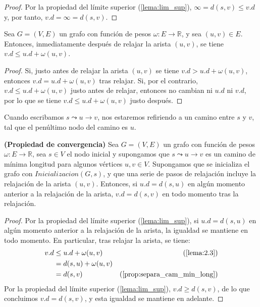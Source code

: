 \begin{proof}
	Por la propiedad del límite superior (\autoref{lema:lim_sup}), $\infty=d(s,v)\leq v.d$ y, por tanto, $v.d=\infty =d(s,v).$
\end{proof}

\begin{lema}\label{lema:2.3}
	Sea $G=(V,E)$ un grafo con función de pesos $\omega : E\rightarrow \mathbb{R}$, y sea $(u,v)\in E$. Entonces, inmediatamente después de relajar la arista $(u,v)$, se tiene $v.d\leq u.d + \omega(u,v)$.
\end{lema}

\begin{proof}
	Si, justo antes de relajar la arista $(u,v)$ se tiene $v.d > u.d + \omega(u,v)$, entonces $v.d = u.d + \omega(u,v)$ tras relajar. Si, por el contrario, $v.d\leq u.d + \omega(u,v)$ justo antes de relajar, entonces no cambian ni $u.d$ ni $v.d$, por lo que se tiene $v.d\leq u.d + \omega(u,v)$ justo después.
\end{proof}

\begin{observacion}
	Cuando escribamos $s \leadsto u \rightarrow v$, nos estaremos refiriendo a un camino entre $s$ y $v$, tal que el penúltimo nodo del camino es $u$.
\end{observacion}

\begin{lema}\label{lema:convergencia}
	\textbf{(Propiedad de convergencia)} Sea $G=(V,E)$ un grafo con función de pesos $\omega : E\rightarrow \mathbb{R}$, sea $s\in V$ el nodo inicial y supongamos que $s \leadsto u \rightarrow v$ es un camino de mínima longitud para algunos vértices $u,v\in V$. Supongamos que se inicializa el grafo con $Inicializacion(G,s)$, y que una serie de pasos de relajación incluye la relajación de la arista $(u,v)$. Entonces, si $u.d=d(s,u)$ en algún momento anterior a la relajación de la arista, $v.d=d(s,v)$ en todo momento tras la relajación.
\end{lema}

\begin{proof}
	Por la propiedad del límite superior (\autoref{lema:lim_sup}), si $u.d=d(s,u)$ en algún momento anterior a la relajación de la arista, la igualdad se mantiene en todo momento. En particular, tras relajar la arista, se tiene:
	\begin{align*}
			v.d & \leq u.d + \omega(u,v) & (\textrm{\autoref{lema:2.3}}) \\
			& = d(s,u) + \omega(u,v) \\
			& = d(s,v) &(\textrm{\autoref{prop:separa_cam_min_long}})
	\end{align*}
	Por la propiedad del límite superior (\autoref{lema:lim_sup}), $v.d\geq d(s,v)$, de lo que concluimos $v.d = d(s,v)$, y esta igualdad se mantiene en adelante.
\end{proof}

